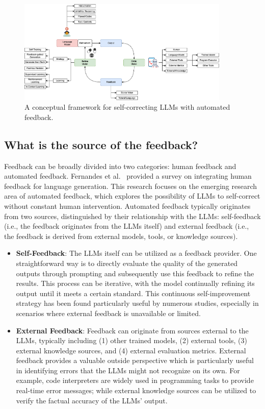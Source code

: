 \documentclass[a4paper,oneside]{book}
\begin{document}
\begin{figure}[!htb]
  \centering
  \includegraphics[width=0.90\textwidth]{img/taxonomy}
  \caption{A conceptual framework for self-correcting LLMs with automated feedback.}\label{fig:taxonomy}
\end{figure}

\subsection{What is the source of the feedback?}
Feedback can be broadly divided into two categories: human feedback and automated feedback. Fernandes et al.~\cite{fernandes2023bridging} provided a survey on integrating human feedback for language generation. This research focuses on the emerging research area of automated feedback, which explores the possibility of LLMs to self-correct without constant human intervention. Automated feedback typically originates from two sources, distinguished by their relationship with the LLMs: self-feedback (i.e., the feedback originates from the LLMs itself) and external feedback (i.e., the feedback is derived from external models, tools, or knowledge sources).

\begin{itemize}
  \item \textbf{Self-Feedback}: The LLMs itself can be utilized as a feedback provider. One straightforward way is to directly evaluate the quality of the generated outputs through prompting and subsequently use this feedback to refine the results. This process can be iterative, with the model continually refining its output until it meets a certain standard. This continuous self-improvement strategy has been found particularly useful by numerous studies, especially in scenarios where external feedback is unavailable or limited.

  \item \textbf{External Feedback}: Feedback can originate from sources external to the LLMs, typically including (1) other trained models, (2) external tools, (3) external knowledge sources, and (4) external evaluation metrics. External feedback provides a valuable outside perspective which is particularly useful in identifying errors that the LLMs might not recognize on its own. For example, code interpreters are widely used in programming tasks to provide real-time error messages; while external knowledge sources can be utilized to verify the factual accuracy of the LLMs' output.
\end{itemize}
\end{document}
